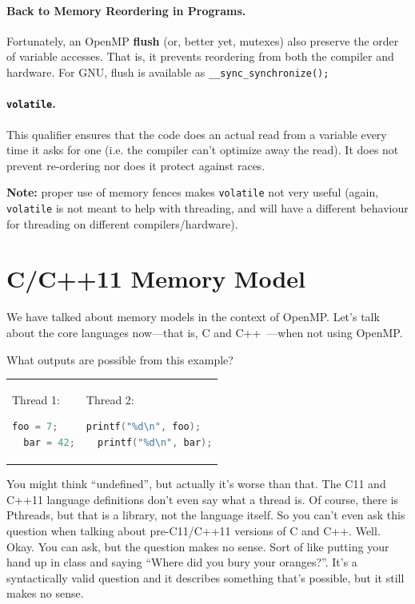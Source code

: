 \documentclass[a4paper]{report}
\begin{document}
\paragraph{Back to Memory Reordering in Programs.}
    Fortunately, an OpenMP {\bf flush} (or, better yet, mutexes) also preserve the order of variable accesses.
    That is, it prevents reordering from both the compiler and hardware.
    For GNU, flush is available as
      {\tt \_\_sync\_synchronize();}

\paragraph{{\tt volatile}.} This qualifier ensures that the
code does an actual read from a variable every time it asks for one
(i.e. the compiler can't optimize away the read). It does not prevent
re-ordering nor does it protect against races.

{\bf Note:} proper use of memory fences makes {\tt volatile} not very
useful (again, {\tt volatile} is not meant to help with threading, and
will have a different behaviour for threading on different
compilers/hardware).


\section*{C/C++11 Memory Model}

We have talked about memory models in the context of OpenMP. Let's
talk about the core languages now---that is, C and C++~\cite{quora:cppthr, cppconcurrency}---when
not using OpenMP.

What outputs are possible from this example?

\begin{tabular}{ll}
      \begin{minipage}{.2\textwidth}
        Thread 1:
        \begin{lstlisting}[language=C]
  foo = 7;
  bar = 42;
        \end{lstlisting}
      \end{minipage} &
      \begin{minipage}{.4\textwidth}
        Thread 2:
        \begin{lstlisting}[language=C]
  printf("%d\n", foo);
  printf("%d\n", bar);
        \end{lstlisting}
      \end{minipage}
\end{tabular}

You might think ``undefined'', but actually it's worse than that. The 
C11 and C++11 language definitions don't even say what a thread is.
Of course, there is Pthreads, but that is a library, not the language itself.
So you can't even ask this question when talking about pre-C11/C++11 versions
of C and C++. Well. Okay. You can ask, but the question makes no sense. Sort of like
putting your hand up in class and saying ``Where did you bury your oranges?''.
It's a syntactically valid question and it describes something that's possible,
but it still makes no sense.
\end{document}
